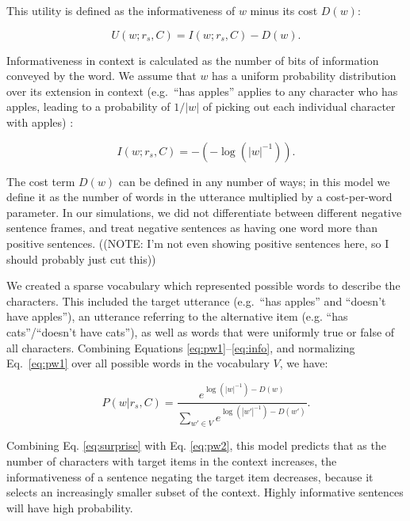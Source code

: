 \documentclass[10pt,letterpaper]{article}
\begin{document}
\noindent This utility is defined as the informativeness of $w$ minus its cost $D(w)$:

\begin{equation}\label{eq:utility}
U(w;r_s,C) = I(w;r_s, C) - D(w).
\end{equation}

\noindent Informativeness in context is calculated as the number of bits of information conveyed by the word. We assume that $w$ has a uniform probability distribution over its extension in context (e.g.\ ``has apples'' applies to any character who has apples, leading to a probability of $1/|w|$ of picking out each individual character with apples) :

\begin{equation}\label{eq:info}
I(w;r_s, C) = -(-\log(|w|^{-1})).
\end{equation}

\noindent The cost term $D(w)$ can be defined in any number of ways; in this model we define it as the number of words in the utterance multiplied by a cost-per-word parameter.  In our simulations, we did not differentiate between different negative sentence frames, and treat negative sentences as having one word more than positive sentences.  ((NOTE: I'm not even showing positive sentences here, so I should probably just cut this))

We created a sparse vocabulary which represented possible words to describe the characters.  This included the target utterance (e.g.\ ``has apples'' and ``doesn't have apples''), an utterance referring to the alternative item (e.g. ``has cats''/``doesn't have cats''), as well as words that were uniformly true or false of all characters. Combining Equations \ref{eq:pw1}--\ref{eq:info}, and normalizing Eq.\ \ref{eq:pw1} over all possible words in the vocabulary $V$, we have:

\begin{equation}\label{eq:pw2}
P(w | r_s, C) = \frac{ e^{\log(|w|^{-1}) - D(w)}} {\sum_{w' \in V}{e^{\log(|w'|^{-1}) - D(w')}}}.
\end{equation}

\noindent Combining Eq. \ref{eq:surprise} with Eq. \ref{eq:pw2}, this model predicts that as the number of characters with target items in the context increases, the informativeness of a sentence negating the target item decreases, because it selects an increasingly smaller subset of the context. Highly informative sentences will have high probability. 
\end{document}
